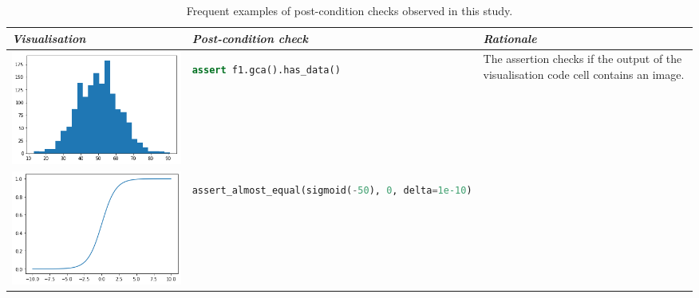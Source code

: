 \documentclass[conference]{IEEEtran}
\begin{document}
\begin{table}
\centering
\caption{Frequent examples of post-condition checks observed in this study.}
  \begin{tabular}{m{} m{} m{}}
\hline
\emph{\textbf{Visualisation}}&
\emph{\textbf{Post-condition check}}&
\emph{\textbf{Rationale}}\\
\hline
\includegraphics[width=\linewidth]{post-cond-01.png}&
\begin{lstlisting}[language=Python]
assert f1.gca().has_data()
\end{lstlisting}&
The assertion checks if the output of the visualisation code cell contains an image.\\
\includegraphics[width=\linewidth]{post-cond-02.png}&
\begin{lstlisting}[language=Python]
assert_almost_equal(sigmoid(-50), 0, delta=1e-10)

\end{lstlisting}
\end{tabular}
\end{table}
\end{document}
